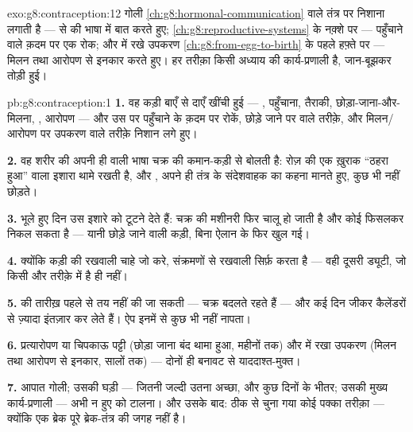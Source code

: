 \begin{solution}{exo:g8:contraception:12}
गोली \cref{ch:g8:hormonal-communication} वाले तंत्र पर निशाना लगाती है
---  से  की भाषा में बात करते हुए; 
\cref{ch:g8:reproductive-systems} के नक़्शे पर --- पहुँचाने वाले क़दम पर
एक रोक; और  में रखे उपकरण
\cref{ch:g8:from-egg-to-birth} के पहले हफ़्ते पर --- मिलन तथा आरोपण से
इनकार करते हुए। हर तरीक़ा किसी अध्याय की कार्य-प्रणाली है, जान-बूझकर
तोड़ी हुई।
\end{solution}

\begin{solution}{pb:g8:contraception:1}
\textbf{1.} वह कड़ी बाएँ से दाएँ खींची हुई --- , पहुँचाना, तैराकी,
छोड़ा-जाना-और-मिलना, , आरोपण --- और उस पर पहुँचाने के क़दम पर
रोकें, छोड़े जाने पर  वाले तरीक़े, और मिलन/आरोपण पर उपकरण वाले
तरीक़े निशान लगे हुए।

\textbf{2.} वह शरीर की अपनी ही  वाली भाषा चक्र की कमान-कड़ी से
बोलती है: रोज़ की एक ख़ुराक ``ठहरा हुआ'' वाला इशारा थामे रखती है, और
, अपने ही तंत्र के संदेशवाहक का कहना मानते हुए, कुछ भी नहीं
छोड़ते।

\textbf{3.} भूले हुए दिन उस इशारे को टूटने देते हैं: चक्र की मशीनरी फिर
चालू हो जाती है और कोई  फिसलकर निकल सकता है --- यानी छोड़े जाने
वाली कड़ी, बिना ऐलान के फिर खुल गई।

\textbf{4.} क्योंकि कड़ी की रखवाली चाहे जो करे, संक्रमणों से रखवाली
सिर्फ़  करता है --- वही दूसरी ड्यूटी, जो किसी और तरीक़े में है ही
नहीं।

\textbf{5.}  की तारीख़ पहले से तय नहीं की जा सकती --- चक्र
बदलते रहते हैं --- और  कई दिन जीकर कैलेंडरों से ज़्यादा
इंतज़ार कर लेते हैं। ऐप इनमें से कुछ भी नहीं नापता।

\textbf{6.} प्रत्यारोपण या चिपकाऊ पट्टी (छोड़ा जाना बंद थामा हुआ,
महीनों तक) और  में रखा उपकरण (मिलन तथा आरोपण से इनकार, सालों तक)
--- दोनों ही बनावट से याददाश्त-मुक्त।

\textbf{7.} आपात गोली; उसकी घड़ी --- जितनी जल्दी उतना अच्छा, और कुछ
दिनों के भीतर; उसकी मुख्य कार्य-प्रणाली --- अभी न हुए  को
टालना। और उसके बाद: ठीक से चुना गया कोई पक्का तरीक़ा --- क्योंकि एक
ब्रेक पूरे ब्रेक-तंत्र की जगह नहीं है।


\end{solution}
